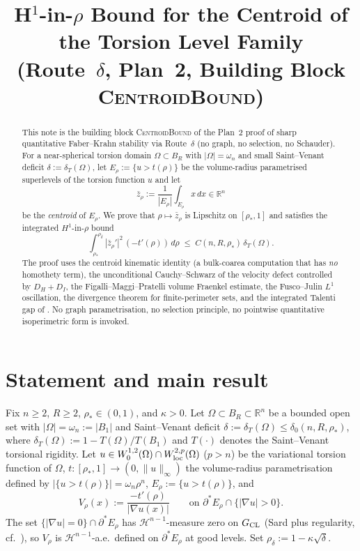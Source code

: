 \documentclass[11pt]{article}
\title{H$^{1}$-in-$\rho$ Bound for the Centroid of the Torsion Level Family\\
       (Route~$\delta$, Plan~2, Building Block \textsc{CentroidBound})}
\author{}
\date{}
\theoremstyle{definition}
\newcommand{\R}{\mathbb{R}}
\newcommand{\Om}{\Omega}
\newcommand{\rstar}{\rho_{*}}
\newcommand{\zbar}{\bar z_{\rho}}
\begin{document}
\maketitle

\begin{abstract}
This note is the building block \textsc{CentroidBound} of the Plan~2
proof of sharp quantitative Faber--Krahn stability via Route~$\delta$
(no graph, no selection, no Schauder). For a near-spherical torsion
domain $\Om\subset B_R$ with $|\Om|=\omega_n$ and small Saint--Venant
deficit $\delta:=\delta_T(\Om)$, let $E_\rho:=\{u>t(\rho)\}$ be the
volume-radius parametrised superlevels of the torsion function $u$
and let
\[
   \zbar:=\frac{1}{|E_\rho|}\int_{E_\rho}x\,dx\in\R^n
\]
be the \emph{centroid} of $E_\rho$. We prove that $\rho\mapsto\zbar$
is Lipschitz on $[\rstar,1]$ and satisfies the integrated
$H^{1}$-in-$\rho$ bound
\[
   \int_{\rstar}^{\rho_\delta}|\bar z_\rho'|^{2}\,(-t'(\rho))\,d\rho
   \;\le\; C(n,R,\rstar)\,\delta_T(\Om).
\]
The proof uses the centroid kinematic identity (a bulk-coarea
computation that has \emph{no} homothety term), the unconditional
Cauchy--Schwarz of the velocity defect controlled by $D_H+D_I$, the
Figalli--Maggi--Pratelli volume Fraenkel estimate, the Fusco--Julin
$L^1$ oscillation, the divergence theorem for finite-perimeter sets,
and the integrated Talenti gap of \cite{LevelSetIdentity}. No graph parametrisation, no
selection principle, no pointwise quantitative isoperimetric form is
invoked.
\end{abstract}

\section{Statement and main result}\label{sec:statement}

Fix $n\ge 2$, $R\ge 2$, $\rstar\in(0,1)$, and $\kappa>0$. Let
$\Om\subset B_R\subset\R^n$ be a bounded open set with
$|\Om|=\omega_n:=|B_1|$ and Saint--Venant deficit
$\delta:=\delta_T(\Om)\le\delta_0(n,R,\rstar)$, where
$\delta_T(\Om):=1-T(\Om)/T(B_1)$ and $T(\cdot)$ denotes the
Saint--Venant torsional rigidity. Let $u\in
W^{1,2}_0(\Om)\cap W^{2,p}_{\rm loc}(\Om)$ ($p>n$) be the variational
torsion function of $\Om$, $t:[\rstar,1]\to(0,\|u\|_\infty)$ the
volume-radius parametrisation defined by
$|\{u>t(\rho)\}|=\omega_n\rho^n$, $E_\rho:=\{u>t(\rho)\}$, and
\[
   V_\rho(x):=\frac{-t'(\rho)}{|\nabla u(x)|}
   \qquad\text{on }\partial^*E_\rho\cap\{|\nabla u|>0\}.
\]
The set $\{|\nabla u|=0\}\cap\partial^*E_\rho$ has
$\mathcal H^{n-1}$-measure zero on $G_{\rm CL}$ (Sard plus regularity,
cf.\ \cite{LevelSetIdentity}), so $V_\rho$ is
$\mathcal H^{n-1}$-a.e.\ defined on $\partial^*E_\rho$ at good levels.
Set $\rho_\delta:=1-\kappa\sqrt{\delta}$.
\end{document}
